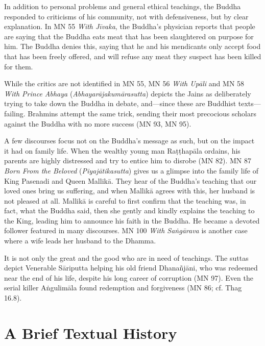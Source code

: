 \documentclass[12pt,openany]{book}%
\begin{document}
In addition to personal problems and general ethical teachings, the Buddha responded to criticisms of his community, not with defensiveness, but by clear explanation. In MN 55 \textit{With \textsanskrit{Jīvaka}}, the Buddha’s physician reports that people are saying that the Buddha eats meat that has been slaughtered on purpose for him. The Buddha denies this, saying that he and his mendicants only accept food that has been freely offered, and will refuse any meat they suspect has been killed for them.

While the critics are not identified in MN 55, MN 56 \textit{With \textsanskrit{Upāli}} and MN 58 \textit{With Prince Abhaya} (\textit{\textsanskrit{Abhayarājakumārasutta}}) depicts the Jains as deliberately trying to take down the Buddha in debate, and—since these are Buddhist texts—failing. Brahmins attempt the same trick, sending their most precocious scholars against the Buddha with no more success (MN 93, MN 95).

A few discourses focus not on the Buddha’s message as such, but on the impact it had on family life. When the wealthy young man \textsanskrit{Raṭṭhapāla} ordains, his parents are highly distressed and try to entice him to disrobe (MN 82). MN 87 \textit{Born From the Beloved} (\textit{\textsanskrit{Piyajātikasutta}}) gives us a glimpse into the family life of King Pasenadi and Queen \textsanskrit{Mallikā}. They hear of the Buddha’s teaching that our loved ones bring us suffering, and when \textsanskrit{Mallikā} agrees with this, her husband is not pleased at all. \textsanskrit{Mallikā} is careful to first confirm that the teaching was, in fact, what the Buddha said, then she gently and kindly explains the teaching to the King, leading him to announce his faith in the Buddha. He became a devoted follower featured in many discourses. MN 100 \textit{With \textsanskrit{Saṅgārava}} is another case where a wife leads her husband to the Dhamma.

It is not only the great and the good who are in need of teachings. The suttas depict Venerable \textsanskrit{Sāriputta} helping his old friend \textsanskrit{Dhanañjāni}, who was redeemed near the end of his life, despite his long career of corruption (MN 97). Even the serial killer \textsanskrit{Aṅgulimāla} found redemption and forgiveness (MN 86; cf. Thag 16.8).

\section*{A Brief Textual History}
\end{document}
